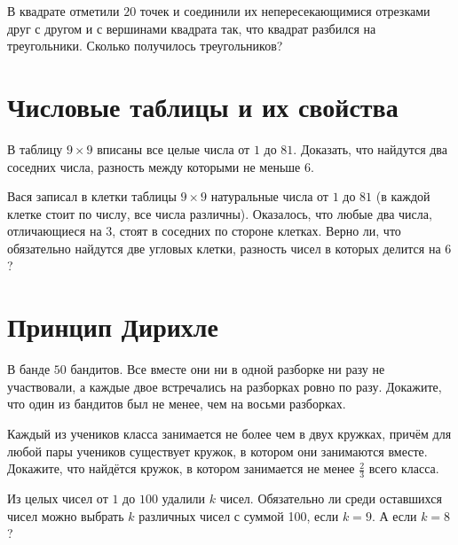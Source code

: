 \documentclass[12pt]{article}
\begin{document}
\begin{task}
В квадрате отметили $20$ точек и соединили их непересекающимися отрезками друг с другом и с вершинами квадрата так, что квадрат разбился на треугольники. Сколько получилось треугольников? 
\end{task}

\section*{Числовые таблицы и их свойства}


\begin{task} В таблицу $9 \times 9$ вписаны все целые числа от $1$ до $81$. Доказать, что найдутся два соседних числа, разность между которыми не меньше $6$. 
\end{task}

\begin{task} 
Вася записал в клетки таблицы $9 \times 9$ натуральные числа от $1$ до $81$ (в каждой клетке стоит по числу, все числа различны). Оказалось, что любые два числа, отличающиеся на $3$, стоят в соседних по стороне клетках. Верно ли, что обязательно найдутся две угловых клетки, разность чисел в которых делится на $6$?
\end{task}




\section*{Принцип Дирихле}

\begin{task}
В банде $50$ бандитов. Все вместе они ни в одной разборке ни разу не участвовали, а каждые двое встречались на разборках ровно по разу. Докажите, что один из бандитов был не менее, чем на восьми разборках. 
\end{task}

\begin{task} Каждый из учеников класса занимается не более чем в двух кружках, причём для любой пары учеников существует кружок, в котором они занимаются вместе. Докажите, что найдётся кружок, в котором занимается не менее $\frac{2}{3}$ всего класса.
\end{task}

\begin{task} Из целых чисел от $1$ до $100$ удалили $k$ чисел. Обязательно ли среди оставшихся чисел можно выбрать $k$ различных чисел с суммой 100, если $k = 9$. А если $k = 8$?
\end{task}
\end{document}
